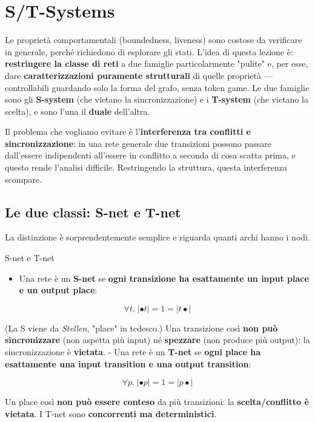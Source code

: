 \chapter{\texorpdfstring{S/T-Systems}{S/T-Systems}}
\label{ch:15}

Le proprietà comportamentali (boundedness, liveness) sono costose da verificare in generale, perché richiedono di esplorare gli stati. L'idea di questa lezione è: \textbf{restringere la classe di reti} a due famiglie particolarmente "pulite" e, per esse, dare \textbf{caratterizzazioni puramente strutturali} di quelle proprietà — controllabili guardando solo la forma del grafo, senza token game. Le due famiglie sono gli \textbf{S-system} (che vietano la sincronizzazione) e i \textbf{T-system} (che vietano la scelta), e sono l'una il \textbf{duale} dell'altra.

Il problema che vogliamo evitare è l'\textbf{interferenza tra conflitti e sincronizzazione}: in una rete generale due transizioni possono passare dall'essere indipendenti all'essere in conflitto a seconda di cosa scatta prima, e questo rende l'analisi difficile. Restringendo la struttura, questa interferenza scompare.

\section{\texorpdfstring{Le due classi: S-net e T-net}{Le due classi: S-net e T-net}}

La distinzione è sorprendentemente semplice e riguarda quanti archi hanno i nodi.

\begin{boxdefinition}{S-net e T-net}
\begin{itemize}
\item Una rete è un \textbf{S-net} se \textbf{ogni transizione ha esattamente un input place e un output place}:
\end{itemize}

\[
\forall t.\; |\bullet t| = 1 = |t\bullet|
\]

(La S viene da \emph{Stellen}, "place" in tedesco.) Una transizione così \textbf{non può sincronizzare} (non aspetta più input) né \textbf{spezzare} (non produce più output): la sincronizzazione è \textbf{vietata}. - Una rete è un \textbf{T-net} se \textbf{ogni place ha esattamente una input transition e una output transition}:

\[
\forall p.\; |\bullet p| = 1 = |p\bullet|
\]

Un place così \textbf{non può essere conteso} da più transizioni: la \textbf{scelta/conflitto è vietata}. I T-net sono \textbf{concorrenti ma deterministici}.
\end{boxdefinition}

